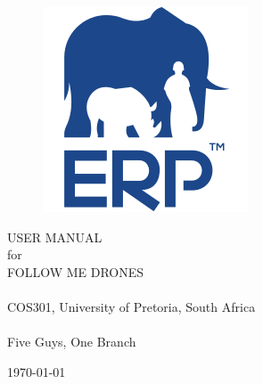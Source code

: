 \documentclass[a4paper,11pt]{book}
\begin{document}
\begin{titlepage}
	\begin{figure}[h!]
		\centering
		\includegraphics[scale=0.5]{./assets/images/erp-logo.png}
		\label{fig: erp-logo}
		\caption{}
	\end{figure}
	\vspace{0.5cm}
	\begin{center}
		\Huge{USER MANUAL}\\
		for\\
		FOLLOW ME DRONES\\
		~\\
		\LARGE{COS301, University of Pretoria, South Africa}\\
		~\\
		Five Guys, One Branch
	\end{center}
	\begin{center}
		\today
	\end{center}
\end{titlepage}
\let\cleardoublepage\clearpage

\tableofcontents

\mainmatter









\end{document}
